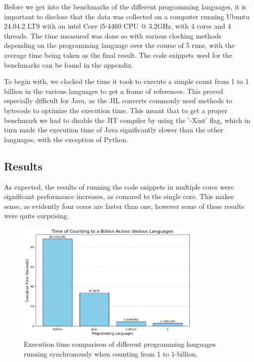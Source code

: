 \documentclass[12pt,a4paper]{article}
\begin{document}
Before we get into the benchmarks of the different programming languages, it is important to disclose that the data was collected on a computer running Ubuntu 24.04.2 LTS with an intel Core i5-4460 CPU @ 3.2GHz, with 4 cores and 4 threads. The time measured was done so with various clocking methods depending on the programming language over the course of 5 runs, with the average time being taken as the final result. The code snippets used for the benchmarks can be found in the appendix.

To begin with, we clocked the time it took to execute a simple count from 1 to 1 billion in the various languages to get a frame of references. This proved especially difficult for Java, as the JIL converts commonly used methods to bytecode to optimize the execution time. This meant that to get a proper benchmark we had to disable the JIT compiler by using the '-Xint' flag, which in turn made the execution time of Java significantly slower than the other languages, with the exception of Python.

\newpage
\subsection{Results}

As expected, the results of running the code snippets in multiple cores were significant performance increases, as comared to the single core. This makes sense, as evidently four cores are faster than one, however some of these results were quite surprising.

\begin{figure}[!htb]
    \centering
    \includegraphics[width=0.8\textwidth]{../sync_records/sync_exec_times.png}
    \captionsetup{font=tiny, justification=centering}
    \caption{Execution time comparison of different programming languages running synchronously when counting from 1 to 1-billion.}
    \label{fig:sync-exec-times}
\end{figure}
\end{document}
